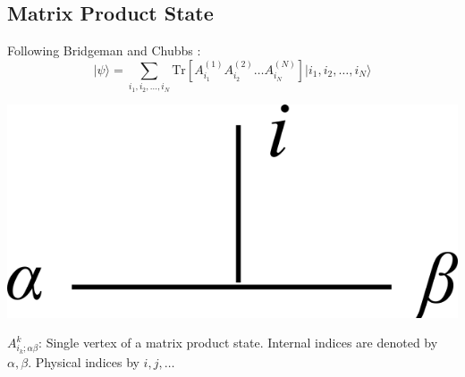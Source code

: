 \documentclass[a0,portrait]{a0poster}
\newcommand{\ket}[1]{\vert #1 \rangle}
\newcommand{\Tr}{\mathrm{Tr}}
\begin{document}
\begin{multicols}{3}


\color{Navy}

\section*{Matrix Product State}

Following Bridgeman and Chubbs \cite{Bridgeman2016Hand-waving}:
\begin{equation}\label{eqn:mps-ansatz}
	\ket{\psi} = \sum_{i_1, i_2, \ldots, i_N} \Tr\left[ A^{(1)}_{i_1} A^{(2)}_{i_2} \ldots A^{(N)}_{i_N} \right] \ket{i_1, i_2, \ldots, i_N}
\end{equation}

\vspace*{2cm}

\begin{minipage}[m]{0.4\columnwidth}
	\centering
	\includegraphics[width=0.5\linewidth]{mps-vertex}
	\label{fig:mps-vertex}
\end{minipage}
\begin{minipage}[m]{0.4\columnwidth}
	$ A^k_{i_k;\alpha\beta} $: Single vertex of a matrix product state. Internal indices are denoted by $ \alpha, \beta $. Physical indices by $ i,j,\ldots $
\end{minipage}

\vspace*{2cm}


\end{multicols}
\end{document}
